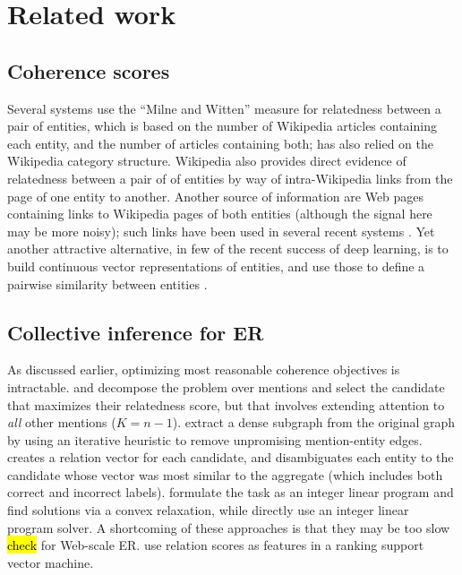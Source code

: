 \section{Related work}
\label{sec:related}

\subsection{Coherence scores}

Several systems \cite{Milne2008,KulkarniSRC09,Hoffart2011} use the ``Milne and Witten'' measure for relatedness between a pair of entities, which is based on the number of Wikipedia articles containing each entity, and the number of articles containing both; \cite{Cucerzan07} has also relied on the Wikipedia category structure. %
Wikipedia also provides direct evidence of relatedness between a pair of of entities by way of intra-Wikipedia links from the page of one entity to another. Another source of information are Web pages containing links to Wikipedia pages of both entities (although the signal here may be more noisy); such links have been used in several recent systems \cite{ChengR13,Chisholm2015}.  Yet another attractive alternative, in few of the recent success of deep learning, is to build continuous vector representations of entities, and use those to define a pairwise similarity between entities \cite{YamadaS0T16}.


\subsection{Collective inference for ER}

As discussed earlier, optimizing most reasonable coherence objectives is intractable.  and  decompose the problem over mentions and select the candidate that maximizes their relatedness score, but that involves extending attention to \emph{all} other mentions ($K=n-1$).   extract a dense subgraph from the original graph by using an iterative heuristic to remove unpromising mention-entity edges. \cite{Cucerzan07} creates a relation vector for each candidate, and disambiguates each entity to the candidate whose vector was most similar to the aggregate (which includes both correct and incorrect labels).  formulate the task as an integer linear program and find solutions via a convex relaxation, while  directly use an integer linear program solver. A shortcoming of these approaches is that they may be too slow \hl{check} for Web-scale ER.  use relation scores as features in a ranking support vector machine.
 
